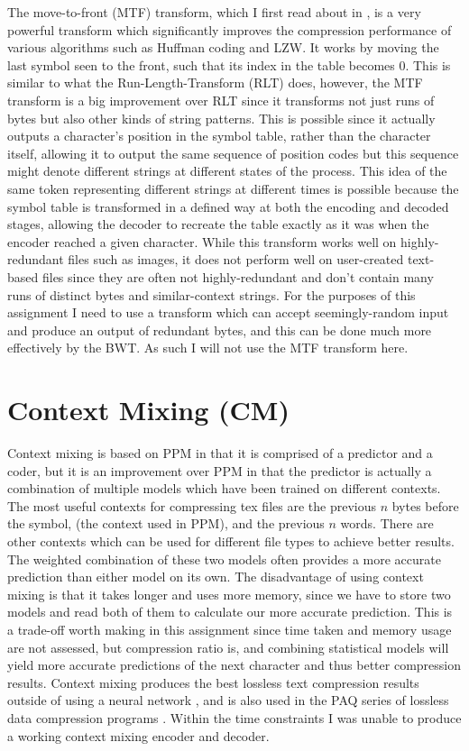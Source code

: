 \documentclass[a4paper, 11pt]{article}
\numberwithin{equation}{section}
\begin{document}
The move-to-front (MTF) transform, which I first read about in \cite{GoogleCompression}, 
is a very powerful transform which significantly improves the compression performance of 
various algorithms such as Huffman coding and LZW. 
It works by moving the last symbol seen to the front, such that its index in the table becomes 0. 
This is similar to what the Run-Length-Transform (RLT) does, however, the MTF transform 
is a big improvement over RLT since it transforms not just runs of bytes but also other kinds of 
string patterns. 
This is possible since it actually outputs a character's position in the symbol table, rather than the 
character itself, allowing it to output the same sequence of position codes but this sequence might denote 
different strings at different states of the process. 
This idea of the same token representing different strings at different times is possible because 
the symbol table is transformed in a defined way at both the encoding and decoded stages, allowing 
the decoder to recreate the table exactly as it was when the encoder reached a given character. 
While this transform works well on highly-redundant files such as images, 
it does not perform well on user-created text-based files since they are often not highly-redundant 
and don't contain many runs of distinct bytes and similar-context strings. 
For the purposes of this assignment I need to use a transform which can accept seemingly-random input 
and produce an output of redundant bytes, and this can be done much more effectively by the BWT. 
As such I will not use the MTF transform here. 


\section{Context Mixing (CM)}

Context mixing is based on PPM in that it is comprised of a predictor and a coder, but it is an improvement 
over PPM in that the predictor is actually a combination of multiple models which have been trained on 
different contexts. 
The most useful contexts for compressing tex files are the previous $n$ bytes before the symbol, 
(the context used in PPM), and the previous $n$ words. 
There are other contexts which can be used for different file types to achieve better results. 
The weighted combination of these two models often provides a more accurate prediction than either 
model on its own. 
The disadvantage of using context mixing is that it takes longer and uses more memory, since we have to 
store two models and read both of them to calculate our more accurate prediction. 
This is a trade-off worth making in this assignment since time taken and memory usage are not assessed, but 
compression ratio is, and combining statistical models will yield more accurate predictions of the next 
character and thus better compression results. 
Context mixing produces the best lossless text compression results outside of using a neural network \cite{TextBenchmark}, 
and is also used in the PAQ series of lossless data compression programs \cite{TextCompression}. 
Within the time constraints I was unable to produce a working context mixing encoder and decoder. 
\end{document}
